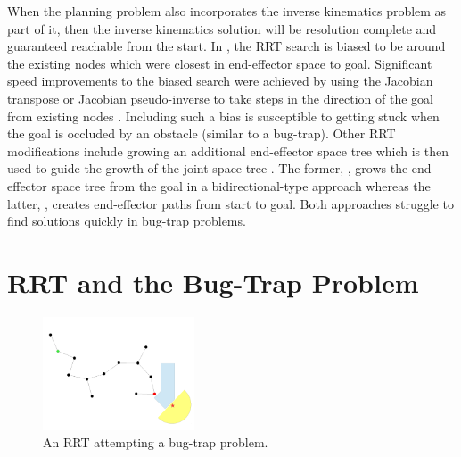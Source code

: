 \documentclass[conference]{IEEEtran}
\begin{document}
When the planning problem also incorporates the inverse kinematics problem
as part of it, then the inverse kinematics solution will be resolution
complete and guaranteed reachable from the start. In \cite{bertram06}, the
RRT search is biased to be around the existing nodes which were closest in 
end-effector space to goal.  Significant speed improvements to the biased
search were achieved by using the Jacobian transpose or Jacobian 
pseudo-inverse to take steps in the direction of the goal from existing
nodes \cite{vahrenkamp09,vande07}.  Including such a bias is susceptible to 
getting stuck when the goal is occluded by an obstacle (similar to a
bug-trap).  Other RRT modifications include growing an additional
end-effector space tree which is then used to guide the growth of the
joint space tree \cite{diankov08,yao05}.  The former, \cite{diankov08},
grows the end-effector space tree from the goal in a bidirectional-type 
approach whereas the latter, \cite{yao05}, creates end-effector paths from 
start to goal. Both approaches struggle to find solutions quickly in 
bug-trap problems.
 
\section{RRT and the Bug-Trap Problem}
\label{sec:bugtraprrt}

\begin{figure}[h!]
  \centering
    \includegraphics[width=0.4\textwidth]{figures/BugTrapRRT.pdf}
  \caption{An RRT attempting a bug-trap problem. \label{fig:BugTrapRRT} }
\end{figure}
\end{document}
